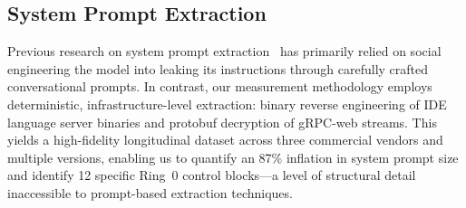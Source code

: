 \subsection{System Prompt Extraction}
Previous research on system prompt extraction~\cite{zhang2024effective} has primarily relied on social engineering the model into leaking its instructions through carefully crafted conversational prompts. In contrast, our measurement methodology employs deterministic, infrastructure-level extraction: binary reverse engineering of IDE language server binaries and protobuf decryption of gRPC-web streams. This yields a high-fidelity longitudinal dataset across three commercial vendors and multiple versions, enabling us to quantify an 87\% inflation in system prompt size and identify 12 specific Ring~0 control blocks---a level of structural detail inaccessible to prompt-based extraction techniques.
